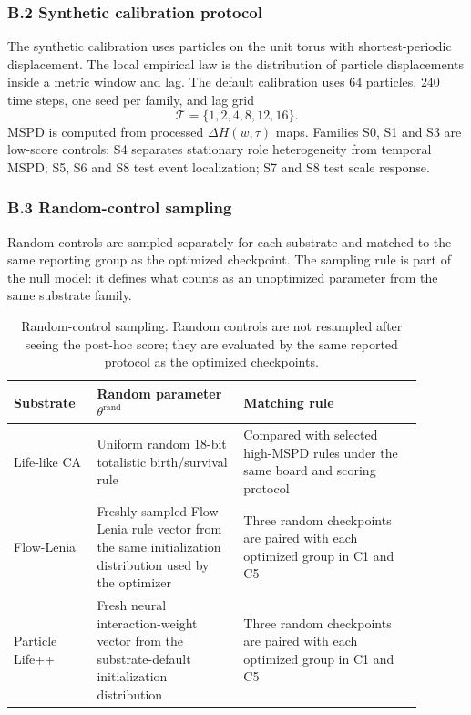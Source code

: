 \subsubsection*{B.2 Synthetic calibration protocol}

The synthetic calibration uses particles on the unit torus with shortest-periodic displacement.  The local empirical law is the distribution of particle displacements inside a metric window and lag.  The default calibration uses $64$ particles, $240$ time steps, one seed per family, and lag grid
\[
  \mathcal T=\{1,2,4,8,12,16\}.
\]
MSPD is computed from processed $\Delta H(w,\tau)$ maps.  Families S0, S1 and S3 are low-score controls; S4 separates stationary role heterogeneity from temporal MSPD; S5, S6 and S8 test event localization; S7 and S8 test scale response.

\subsubsection*{B.3 Random-control sampling}

Random controls are sampled separately for each substrate and matched to the same reporting group as the optimized checkpoint.  The sampling rule is part of the null model: it defines what counts as an unoptimized parameter from the same substrate family.

\begin{table}[H]
\centering
\footnotesize
\begin{tabular}{p{0.18\linewidth}p{0.32\linewidth}p{0.39\linewidth}}
\toprule
Substrate & Random parameter $\theta^{\mathrm{rand}}$ & Matching rule \\
\midrule
Life-like CA & Uniform random 18-bit totalistic birth/survival rule & Compared with selected high-MSPD rules under the same board and scoring protocol \\
Flow-Lenia & Freshly sampled Flow-Lenia rule vector from the same initialization distribution used by the optimizer & Three random checkpoints are paired with each optimized group in C1 and C5 \\
Particle Life++ & Fresh neural interaction-weight vector from the substrate-default initialization distribution & Three random checkpoints are paired with each optimized group in C1 and C5 \\
\bottomrule
\end{tabular}
\caption{Random-control sampling.  Random controls are not resampled after seeing the post-hoc score; they are evaluated by the same reported protocol as the optimized checkpoints.}
\label{tab:random-controls}
\end{table}
\FloatBarrier

